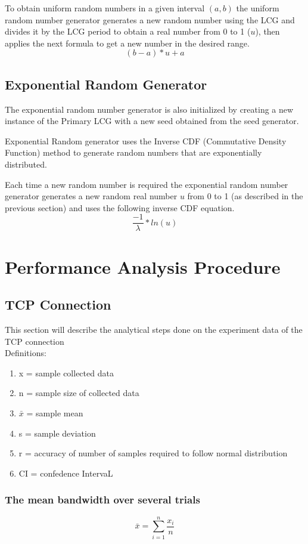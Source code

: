 \documentclass[aps,letterpaper,10pt]{revtex4}
\begin{document}
    To obtain uniform random numbers in a given interval $(a,b)$ the uniform
    random number generator generates a new random number using the LCG and
    divides it by the LCG period to obtain a real number from 0 to 1 ($u$), then
    applies the next formula to get a new number in the desired range.
    \[(b-a)*u + a\]
\subsection{Exponential Random Generator}
    The exponential random number generator is also initialized by creating a
    new instance of the Primary LCG with a new seed obtained from the seed
    generator.

    Exponential Random generator uses the Inverse CDF (Commutative Density
    Function) method to generate random numbers that are exponentially
    distributed.

    Each time a new random number is required the exponential random number
    generator generates a new random real number $u$ from 0 to 1 (as described in
    the previous section) and uses the following inverse CDF equation.
    \[\frac{-1}{\lambda} * ln (u)\]



\newpage
\section{Performance Analysis Procedure}
    \subsection{TCP Connection}
This section will describe the analytical steps done on the experiment data of the TCP connection\\
Definitions:
    \begin{enumerate}
        \item x = sample collected data
        \item n = sample size of collected data
        \item $\bar{x}$ = sample mean 
        \item s = sample deviation 
        \item r = accuracy of number of samples required to follow normal distribution 
        \item CI = confedence IntervaL 
    \end{enumerate}
    \subsubsection{The mean bandwidth over several trials}
            \[
            \bar{x} = \sum_{i=1}^n{\frac{x_{i}}{n}}
            \]
\end{document}
